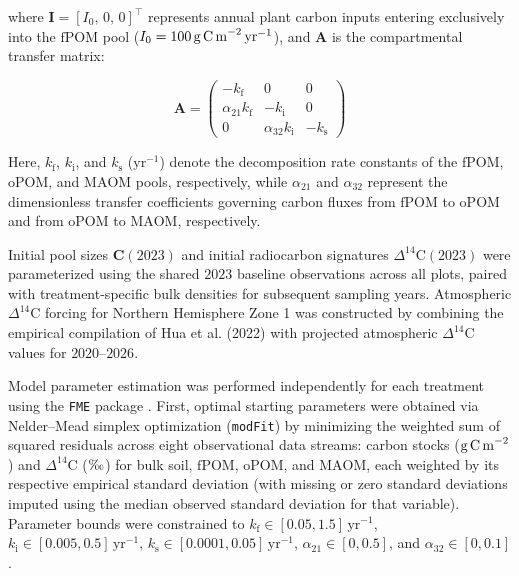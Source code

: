 \documentclass[preprint,12pt]{elsarticle}
\begin{document}
where $\mathbf{I} = [I_0,\, 0,\, 0]^{\top}$ represents annual plant carbon inputs entering exclusively into the $\text{fPOM}$ pool ($I_0 = 100\,\text{g\,C\,m}^{-2}\,\text{yr}^{-1}$), and $\mathbf{A}$ is the compartmental transfer matrix:

\begin{equation}
\mathbf{A} = \begin{pmatrix}
-k_{\text{f}} & 0 & 0 \\
\alpha_{21} k_{\text{f}} & -k_{\text{i}} & 0 \\
0 & \alpha_{32} k_{\text{i}} & -k_{\text{s}}
\end{pmatrix}
\end{equation}

Here, $k_{\text{f}}$, $k_{\text{i}}$, and $k_{\text{s}}$ ($\text{yr}^{-1}$) denote the decomposition rate constants of the $\text{fPOM}$, $\text{oPOM}$, and $\text{MAOM}$ pools, respectively, while $\alpha_{21}$ and $\alpha_{32}$ represent the dimensionless transfer coefficients governing carbon fluxes from $\text{fPOM}$ to $\text{oPOM}$ and from $\text{oPOM}$ to $\text{MAOM}$, respectively.

Initial pool sizes $\mathbf{C}(2023)$ and initial radiocarbon signatures $\Delta^{14}\text{C}(2023)$ were parameterized using the shared $2023$ baseline observations across all plots, paired with treatment-specific bulk densities for subsequent sampling years. Atmospheric $\Delta^{14}\text{C}$ forcing for Northern Hemisphere Zone 1 was constructed by combining the empirical compilation of Hua et al. (2022) \citet{Hua2022} with projected atmospheric $\Delta^{14}\text{C}$ values for $2020\text{--}2026$.

Model parameter estimation was performed independently for each treatment using the \texttt{FME} package \citep{Soetaert2010}. First, optimal starting parameters were obtained via Nelder--Mead simplex optimization (\texttt{modFit}) by minimizing the weighted sum of squared residuals across eight observational data streams: carbon stocks ($\text{g\,C\,m}^{-2}$) and $\Delta^{14}\text{C}$ ($\text{\textperthousand}$) for bulk soil, $\text{fPOM}$, $\text{oPOM}$, and $\text{MAOM}$, each weighted by its respective empirical standard deviation (with missing or zero standard deviations imputed using the median observed standard deviation for that variable). Parameter bounds were constrained to $k_{\text{f}} \in [0.05, 1.5]\,\text{yr}^{-1}$, $k_{\text{i}} \in [0.005, 0.5]\,\text{yr}^{-1}$, $k_{\text{s}} \in [0.0001, 0.05]\,\text{yr}^{-1}$, $\alpha_{21} \in [0, 0.5]$, and $\alpha_{32} \in [0, 0.1]$.
\end{document}

